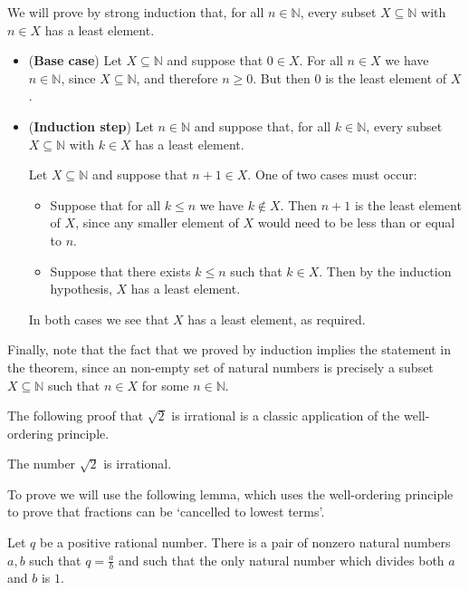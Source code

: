 \begin{cproof}
We will prove by strong induction that, for all $n \in \mathbb{N}$, every subset $X \subseteq \mathbb{N}$ with $n \in X$ has a least element.

\begin{itemize}
\item (\textbf{Base case}) Let $X \subseteq \mathbb{N}$ and suppose that $0 \in X$. For all $n \in X$ we have $n \in \mathbb{N}$, since $X \subseteq \mathbb{N}$, and therefore $n \ge 0$. But then $0$ is the least element of $X$.
\item (\textbf{Induction step}) Let $n \in \mathbb{N}$ and suppose that, for all $k \in \mathbb{N}$, every subset $X \subseteq \mathbb{N}$ with $k \in X$ has a least element.

Let $X \subseteq \mathbb{N}$ and suppose that $n+1 \in X$. One of two cases must occur:
\begin{itemize}
\item Suppose that for all $k \le n$ we have $k \not\in X$. Then $n+1$ is the least element of $X$, since any smaller element of $X$ would need to be less than or equal to $n$.
\item Suppose that there exists $k \le n$ such that $k \in X$. Then by the induction hypothesis, $X$ has a least element.
\end{itemize}
In both cases we see that $X$ has a least element, as required.
\end{itemize}

Finally, note that the fact that we proved by induction implies the statement in the theorem, since an non-empty set of natural numbers is precisely a subset $X \subseteq \mathbb{N}$ such that $n \in X$ for some $n \in \mathbb{N}$.
\end{cproof}

The following proof that $\sqrt{2}$ is irrational is a classic application of the well-ordering principle.

\begin{proposition}
\label{propSqrt2Irrational}
The number $\sqrt{2}$ is irrational.
\end{proposition}

To prove  we will use the following lemma, which uses the well-ordering principle to prove that fractions can be `cancelled to lowest terms'.

\begin{lemma}
\label{lemFractionInLowestTerms}
Let $q$ be a positive rational number. There is a pair of nonzero natural numbers $a,b$ such that $q=\frac{a}{b}$ and such that the only natural number which divides both $a$ and $b$ is $1$.
\end{lemma}

